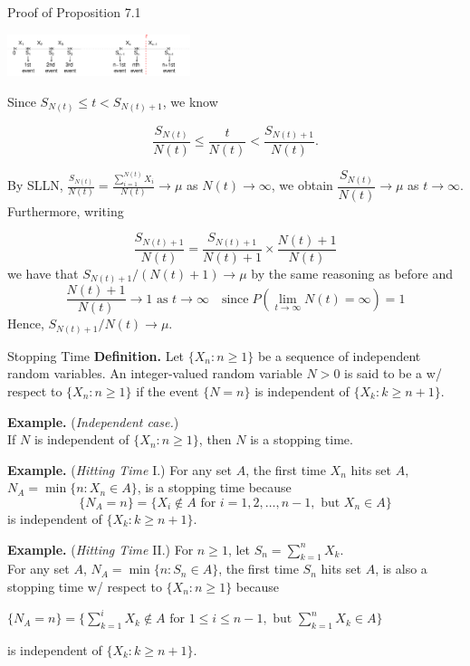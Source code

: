 \documentclass[letterpaper,handout, mathserif]{beamer}
\begin{document}
\begin{frame}{Proof of Proposition 7.1}

\vspace{-8pt}\begin{flushright}
\includegraphics[width=0.4\textwidth, trim=3in 0 0 0 0, clip]{interarrivaltimes.pdf}
\end{flushright}

\vspace{-60pt}
\begin{minipage}{0.7\textwidth}
Since $S_{N(t)}\le t < S_{N(t)+1}$, we know

$$\frac{S_{N(t)}}{N(t)}\le \frac{t}{N(t)} < \frac{S_{N(t)+1}}{N(t)}.$$
\end{minipage}\smallskip

By SLLN,
$\frac{S_{N(t)}}{N(t)} =\frac{\sum_{i=1}^{N(t)}X_i}{N(t)}\to \mu$
as $N(t)\to\infty$,
we obtain $\dfrac{S_{N(t)}}{N(t)} \to \mu$ as $t\to\infty$.
Furthermore, writing

$$\frac{S_{N(t)+1}}{N(t)}=\frac{S_{N(t)+1}}{N(t)+1}\times\frac{N(t)+1}{N(t)}$$
we have that $S_{N(t)+1}/(N(t) +1)\to\mu$ by the same reasoning as before and
$$\frac{N(t)+ 1}{N(t)}\to1\mbox{ as }t\to\infty\quad\text{since}\;P(\lim_{t\to\infty}N(t)=\infty)=1$$
Hence, $S_{N(t)+1}/N(t)\to\mu$.
\end{frame}
\begin{frame}{Stopping Time}
\textbf{Definition.} Let $\{X_n: n\ge 1\}$ be a sequence of independent random variables. An integer-valued random variable $N>0$ is said to be a  w/ respect to $\{X_n: n\ge 1\}$ if the event $\{N=n\}$ is independent of $\{X_k: k\ge n+1\}.$\medskip

\textbf{Example.} ({\em Independent case.})\\
If $N$ is independent of $\{X_n: n\ge 1\}$, then $N$ is a stopping time.\medskip

\textbf{Example.} ({\em Hitting Time} I.)
For any set $A$, the first time $X_n$ hits set $A$,
$N_A = \min\{n: X_n \in A\}$, is a stopping time because
$$
\{N_A=n\}=\{X_i\not\in A \text{ for }i=1,2,\ldots,n-1,\text{ but }X_n\in A\}
$$
is independent of $\{X_k: k\ge n+1\}$.\par\medskip
\textbf{Example.} ({\em Hitting Time} II.) For $n\ge 1$, let $S_n=\sum_{k=1}^nX_k$.\\
For any set $A$, $N_A = \min\{n: S_n \in A\}$, the first time $S_n$ hits set $A$,
is also a stopping time w/ respect to $\{X_n: n\ge 1\}$ because\smallskip

$\{N_A=n\}=\{\sum_{k=1}^iX_k\not\in A \text{ for }1\le i\le n-1,\text{ but }\sum_{k=1}^nX_k\in A\}$\smallskip

is independent of $\{X_k: k\ge n+1\}$.
\end{frame}
\end{document}

